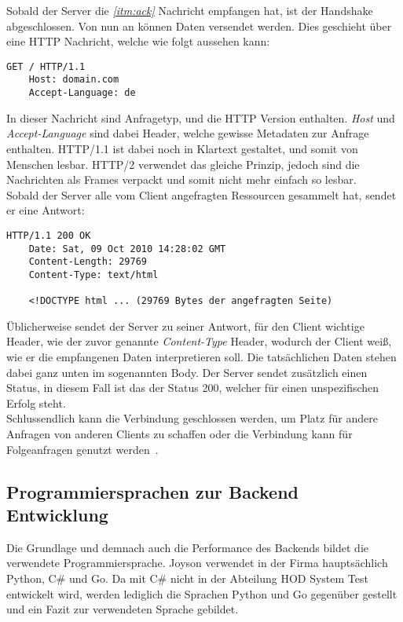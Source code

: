 Sobald der Server die \textit{\ref{itm:ack}} Nachricht empfangen hat, ist der Handshake
abgeschlossen. Von nun an können Daten versendet werden. Dies geschieht über
eine HTTP Nachricht, welche wie folgt aussehen kann:

\begin{lstlisting}[caption=Beispielhafte HTTP Anfrage]
    GET / HTTP/1.1
    Host: domain.com
    Accept-Language: de
\end{lstlisting}

In dieser Nachricht sind Anfragetyp, und die HTTP Version enthalten. \textit{Host}
und \textit{Accept-Language} sind dabei Header, welche gewisse Metadaten zur 
Anfrage enthalten. HTTP/1.1 ist dabei noch in Klartext gestaltet, und somit 
von Menschen lesbar. HTTP/2 verwendet das gleiche Prinzip, jedoch sind die 
Nachrichten als Frames verpackt und somit nicht mehr einfach so lesbar. \\

Sobald der Server alle vom Client angefragten Ressourcen gesammelt hat, 
sendet er eine Antwort:

\begin{lstlisting}[caption=Beispielhafte HTTP Antwort]
    HTTP/1.1 200 OK
    Date: Sat, 09 Oct 2010 14:28:02 GMT
    Content-Length: 29769
    Content-Type: text/html
    
    <!DOCTYPE html ... (29769 Bytes der angefragten Seite)
\end{lstlisting}

Üblicherweise sendet der Server zu seiner Antwort, für den Client wichtige Header,
wie der zuvor genannte \textit{Content-Type} Header, wodurch der Client weiß,
wie er die empfangenen Daten interpretieren soll. Die tatsächlichen Daten stehen
dabei ganz unten im sogenannten Body. Der Server sendet zusätzlich einen Status,
in diesem Fall ist das der Status 200, welcher für einen unspezifischen Erfolg
steht. \\

Schlussendlich kann die Verbindung geschlossen werden, um Platz für andere Anfragen
von anderen Clients zu schaffen oder die Verbindung kann für Folgeanfragen genutzt
werden~\cite{http02}.


\subsection{Programmiersprachen zur Backend Entwicklung}
Die Grundlage und demnach auch die Performance des Backends bildet die 
verwendete Programmiersprache. Joyson verwendet in der Firma hauptsächlich 
Python, C\# und Go. Da mit C\# nicht in der Abteilung 
\gls{HOD} System Test entwickelt wird, werden lediglich die 
Sprachen Python und Go gegenüber gestellt und ein Fazit zur verwendeten Sprache 
gebildet. \\

